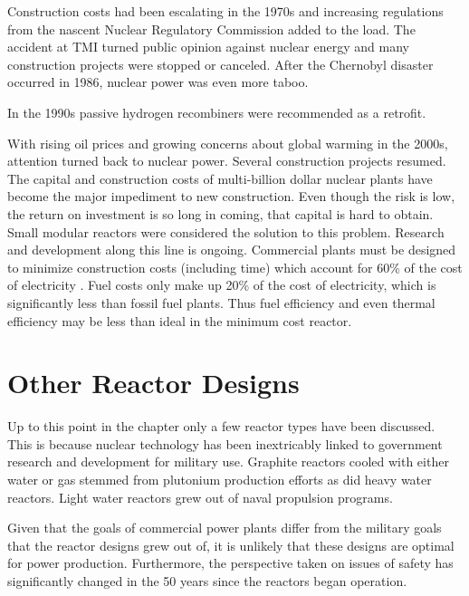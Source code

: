 Construction costs had been escalating in the 1970s and increasing regulations from the nascent Nuclear Regulatory Commission added to the load.
 The accident at TMI turned public opinion against nuclear energy and many construction projects were stopped or canceled.%
After the Chernobyl disaster occurred in 1986, nuclear power was even more taboo.

In the 1990s passive hydrogen recombiners were recommended as a retrofit.

With rising oil prices and growing concerns about global warming in the 2000s, attention turned back to nuclear power. Several construction projects resumed. 
The capital and construction costs of multi-billion dollar nuclear plants have become the major impediment to new construction. Even though the risk is low, the return on investment is so long in coming, that capital is hard to obtain.
Small modular reactors were considered the solution to this problem. Research and development along this line is ongoing.
Commercial plants must be designed to minimize construction costs (including time) which account for 60\% of the cost of electricity \cite{coolant_comparison}. Fuel costs only make up 20\% of the cost of electricity, which is significantly less than fossil fuel plants. Thus fuel efficiency and even thermal efficiency may be less than ideal in the minimum cost reactor.

\section{Other Reactor Designs}
Up to this point in the chapter only a few reactor types have been discussed. This is because nuclear technology has been inextricably linked to government research and development for military use. 
Graphite reactors cooled with either water or gas stemmed from plutonium production efforts as did heavy water reactors. %
Light water reactors grew out of naval propulsion programs. 

Given that the goals of commercial power plants differ from the military goals that the reactor designs grew out of, it is unlikely that these designs are optimal for power production. Furthermore, the perspective taken on issues of safety has significantly changed in the 50 years since the reactors began operation. 


